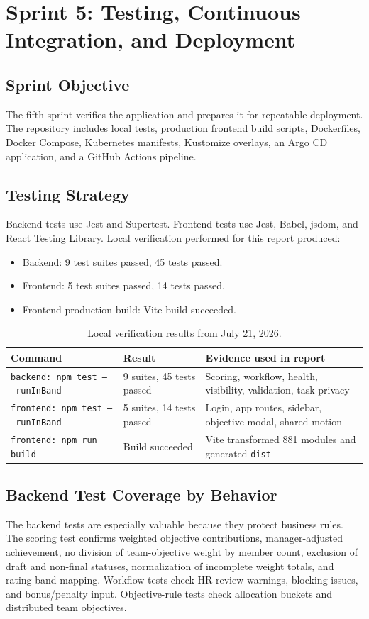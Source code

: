 \chapter{Sprint 5: Testing, Continuous Integration, and Deployment}
\section{Sprint Objective}
The fifth sprint verifies the application and prepares it for repeatable deployment. The repository includes local tests, production frontend build scripts, Dockerfiles, Docker Compose, Kubernetes manifests, Kustomize overlays, an Argo CD application, and a GitHub Actions pipeline.

\section{Testing Strategy}
Backend tests use Jest and Supertest. Frontend tests use Jest, Babel, jsdom, and React Testing Library. Local verification performed for this report produced:
\begin{itemize}
\item Backend: 9 test suites passed, 45 tests passed.
\item Frontend: 5 test suites passed, 14 tests passed.
\item Frontend production build: Vite build succeeded.
\end{itemize}

\begin{table}[H]\centering\small
\caption{Local verification results from July 21, 2026.}
\label{tab:local-verification}
\begin{tabularx}{\textwidth}{p{}p{}Y}
\toprule
Command & Result & Evidence used in report\\
\midrule
\texttt{backend: npm test -- --runInBand} & 9 suites, 45 tests passed & Scoring, workflow, health, visibility, validation, task privacy\\
\texttt{frontend: npm test -- --runInBand} & 5 suites, 14 tests passed & Login, app routes, sidebar, objective modal, shared motion\\
\texttt{frontend: npm run build} & Build succeeded & Vite transformed 881 modules and generated \texttt{dist}\\
\bottomrule
\end{tabularx}
\end{table}

\section{Backend Test Coverage by Behavior}
The backend tests are especially valuable because they protect business rules. The scoring test confirms weighted objective contributions, manager-adjusted achievement, no division of team-objective weight by member count, exclusion of draft and non-final statuses, normalization of incomplete weight totals, and rating-band mapping. Workflow tests check HR review warnings, blocking issues, and bonus/penalty input. Objective-rule tests check allocation buckets and distributed team objectives.

